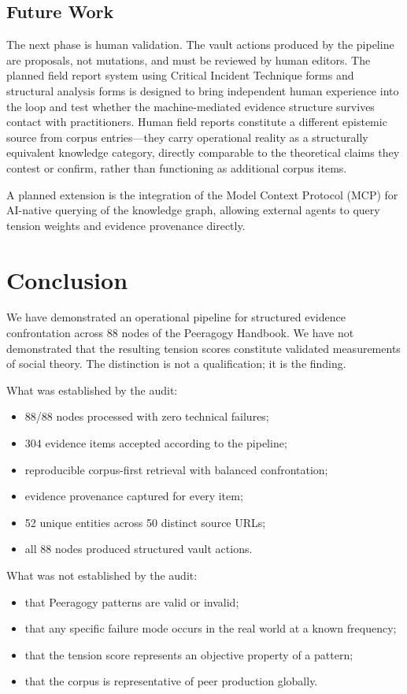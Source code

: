 \documentclass[10pt,twocolumn]{article}
\begin{document}
\subsection{Future Work}

The next phase is human validation. The vault actions produced by the pipeline are proposals, not mutations, and must be reviewed by human editors. The planned field report system using Critical Incident Technique forms and structural analysis forms is designed to bring independent human experience into the loop and test whether the machine-mediated evidence structure survives contact with practitioners. Human field reports constitute a different epistemic source from corpus entries---they carry operational reality as a structurally equivalent knowledge category, directly comparable to the theoretical claims they contest or confirm, rather than functioning as additional corpus items.

A planned extension is the integration of the Model Context Protocol (MCP) for AI-native querying of the knowledge graph, allowing external agents to query tension weights and evidence provenance directly.

\section{Conclusion}
\label{sec:conclusion}

We have demonstrated an operational pipeline for structured evidence confrontation across 88 nodes of the Peeragogy Handbook. We have not demonstrated that the resulting tension scores constitute validated measurements of social theory. The distinction is not a qualification; it is the finding.

What was established by the audit:
\begin{itemize}
    \item 88/88 nodes processed with zero technical failures;
    \item 304 evidence items accepted according to the pipeline;
    \item reproducible corpus-first retrieval with balanced confrontation;
    \item evidence provenance captured for every item;
    \item 52 unique entities across 50 distinct source URLs;
    \item all 88 nodes produced structured vault actions.
\end{itemize}

What was not established by the audit:
\begin{itemize}
    \item that Peeragogy patterns are valid or invalid;
    \item that any specific failure mode occurs in the real world at a known frequency;
    \item that the tension score represents an objective property of a pattern;
    \item that the corpus is representative of peer production globally.
\end{itemize}
\end{document}
